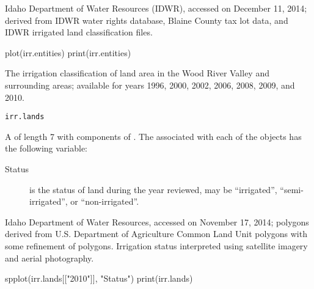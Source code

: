 \documentclass[letterpaper]{book}
\begin{document}
%
\begin{Source}\relax
Idaho Department of Water Resources (IDWR), accessed on December 11, 2014;
derived from IDWR water rights database, Blaine County tax lot data, and IDWR irrigated land classification files.
\end{Source}
%
\begin{Examples}
\begin{ExampleCode}
plot(irr.entities)
print(irr.entities)
\end{ExampleCode}
\end{Examples}
%
\begin{Description}\relax
The irrigation classification of land area in the Wood River Valley and surrounding areas; available for years 1996, 2000, 2002, 2006, 2008, 2009, and 2010.
\end{Description}
%
\begin{Usage}
\begin{verbatim}
irr.lands
\end{verbatim}
\end{Usage}
%
\begin{Format}
A  of length 7 with components of .
The  associated with each of the  objects has the following variable:
\begin{description}

\item[Status] is the status of land during the year reviewed, may be ``irrigated'', ``semi-irrigated'', or ``non-irrigated''.

\end{description}

\end{Format}
%
\begin{Source}\relax
Idaho Department of Water Resources, accessed on November 17, 2014;
polygons derived from U.S. Department of Agriculture Common Land Unit polygons with some refinement of polygons.
Irrigation status interpreted using satellite imagery and aerial photography.
\end{Source}
%
\begin{SeeAlso}\relax
{}
\end{SeeAlso}
%
\begin{Examples}
\begin{ExampleCode}
spplot(irr.lands[["2010"]], "Status")
print(irr.lands)
\end{ExampleCode}
\end{Examples}
\end{document}
